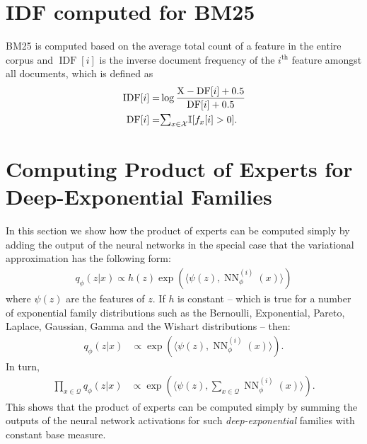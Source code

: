 \documentclass[a4paper]{article}
\newcommand{\ath}[1]{#1^{\textrm{th}}}
\newcommand{\bI}{\mathbb{I}}
\newcommand{\cQ}{\mathcal{Q}}
\newcommand{\cX}{\mathcal{X}}
\newcommand{\ip}[2]{\langle  #1, #2 \rangle}
\newcommand{\rX}{\mathrm{X}}
\DeclareMathOperator{\IDF}{IDF}
\DeclareMathOperator{\NN}{NN}
\newcommand{\infnn}{\NN^{(i)}_\phi}
\newcommand{\sumc}{\raisebox{-0.7ex}{$\mathlarger{\mathlarger{\mathlarger{\mathlarger{\Sigma}}}}$}}
\DeclareMathOperator{\DF}{DF}
\begin{document}


\appendix
\section{IDF computed for BM25}
\label{bm25-idf}
BM25 is computed based on the average total count of a feature in the entire corpus %
and $\IDF[i]$ is the inverse document frequency of the $\ath{i}$ feature amongst all documents,
which is defined as
\begin{align*}
\IDF[i]= &\log \frac{\rX - \DF[i] + 0.5}{\DF[i] + 0.5} \\
\DF[i] = &\sumc_{x \in \cX} \bI[f_x[i] > 0].
\end{align*}


\section{Computing Product of Experts for Deep-Exponential Families}
\label{sec:comp-prod-experts}
In this section we  show how the product of experts can be computed simply by adding the output
of the neural networks in the special case that the variational approximation has the following form:
\begin{align}
q_\phi(z | x) \propto h(z) \exp( \ip{\psi(z) }{\infnn(x)})
\end{align}
where $\psi(z)$ are the features of $z$. If $h$  is constant --
which is true for a number of exponential family distributions such as the Bernoulli, Exponential, Pareto, Laplace, Gaussian, Gamma and the Wishart distributions -- then:
\begin{align*}
  q_\phi(z | x) &\propto \exp( \ip{\psi(z) }{\infnn(x)}).%
\end{align*}
In turn,
\begin{align*}
\prod_{x \in \cQ}q_\phi(z | x) &\propto \exp( \ip{\psi(z) }{\sum_{x \in \cQ}\infnn(x)}).
\end{align*}
This shows that the product of experts can be computed
simply by summing the outputs of the neural network activations
for such \textit{deep-exponential} families with constant base measure.
\end{document}
